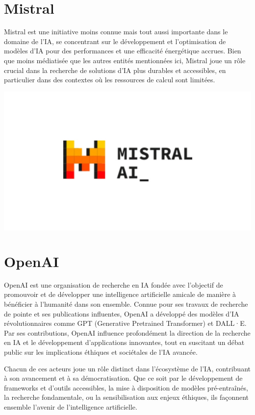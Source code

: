 \documentclass[
  letterpaper,
  DIV=11,
  numbers=noendperiod]{scrreprt}
\begin{document}
\section{Mistral}\label{mistral}

Mistral est une initiative moins connue mais tout aussi importante dans
le domaine de l'IA, se concentrant sur le développement et
l'optimisation de modèles d'IA pour des performances et une efficacité
énergétique accrues. Bien que moins médiatisée que les autres entités
mentionnées ici, Mistral joue un rôle crucial dans la recherche de
solutions d'IA plus durables et accessibles, en particulier dans des
contextes où les ressources de calcul sont limitées.

\includegraphics{images/News_Image_-_2023-12-11T192644.220.jpeg}

\section{OpenAI}\label{openai}

OpenAI est une organisation de recherche en IA fondée avec l'objectif de
promouvoir et de développer une intelligence artificielle amicale de
manière à bénéficier à l'humanité dans son ensemble. Connue pour ses
travaux de recherche de pointe et ses publications influentes, OpenAI a
développé des modèles d'IA révolutionnaires comme GPT (Generative
Pretrained Transformer) et DALL·E. Par ses contributions, OpenAI
influence profondément la direction de la recherche en IA et le
développement d'applications innovantes, tout en suscitant un débat
public sur les implications éthiques et sociétales de l'IA avancée.

Chacun de ces acteurs joue un rôle distinct dans l'écosystème de l'IA,
contribuant à son avancement et à sa démocratisation. Que ce soit par le
développement de frameworks et d'outils accessibles, la mise à
disposition de modèles pré-entraînés, la recherche fondamentale, ou la
sensibilisation aux enjeux éthiques, ils façonnent ensemble l'avenir de
l'intelligence artificielle.
\end{document}
